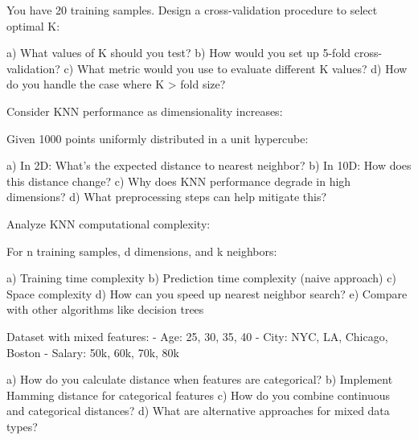 \documentclass{article}
\newcounter{exercise}
\begin{document}
\begin{tcolorbox}[colback=gray!5!white,colframe=gray!75!black,title=Problem \stepcounter{exercise}: Cross-Validation for K Selection]

You have 20 training samples. Design a cross-validation procedure to select optimal K:

a) What values of K should you test?
b) How would you set up 5-fold cross-validation?
c) What metric would you use to evaluate different K values?
d) How do you handle the case where K > fold size?
\end{tcolorbox}

\begin{tcolorbox}[colback=gray!5!white,colframe=gray!75!black,title=Problem \stepcounter{exercise}: Curse of Dimensionality]

Consider KNN performance as dimensionality increases:

Given 1000 points uniformly distributed in a unit hypercube:

a) In 2D: What's the expected distance to nearest neighbor?
b) In 10D: How does this distance change?
c) Why does KNN performance degrade in high dimensions?
d) What preprocessing steps can help mitigate this?
\end{tcolorbox}

\begin{tcolorbox}[colback=gray!5!white,colframe=gray!75!black,title=Problem \stepcounter{exercise}: Computational Complexity]

Analyze KNN computational complexity:

For n training samples, d dimensions, and k neighbors:

a) Training time complexity
b) Prediction time complexity (naive approach)
c) Space complexity
d) How can you speed up nearest neighbor search?
e) Compare with other algorithms like decision trees
\end{tcolorbox}

\begin{tcolorbox}[colback=gray!5!white,colframe=gray!75!black,title=Problem \stepcounter{exercise}: Handling Categorical Variables]

Dataset with mixed features:
- Age: 25, 30, 35, 40
- City: NYC, LA, Chicago, Boston  
- Salary: 50k, 60k, 70k, 80k

a) How do you calculate distance when features are categorical?
b) Implement Hamming distance for categorical features
c) How do you combine continuous and categorical distances?
d) What are alternative approaches for mixed data types?
\end{tcolorbox}
\end{document}
